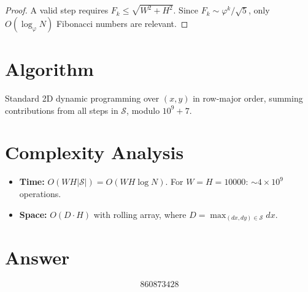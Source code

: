 \documentclass[11pt]{article}
\begin{document}
\begin{proof}
A valid step requires $F_k \le \sqrt{W^2+H^2}$. Since $F_k \sim \varphi^k/\sqrt{5}$, only $O(\log_\varphi N)$ Fibonacci numbers are relevant.
\end{proof}

\section{Algorithm}

Standard 2D dynamic programming over $(x,y)$ in row-major order, summing contributions from all steps in $\mathcal{S}$, modulo $10^9+7$.

\section{Complexity Analysis}

\begin{itemize}
\item \textbf{Time:} $O(WH|\mathcal{S}|) = O(WH\log N)$. For $W=H=10000$: $\sim 4 \times 10^9$ operations.
\item \textbf{Space:} $O(D \cdot H)$ with rolling array, where $D = \max_{(dx,dy)\in\mathcal{S}} dx$.
\end{itemize}

\section{Answer}

\[
\boxed{860873428}
\]
\end{document}
